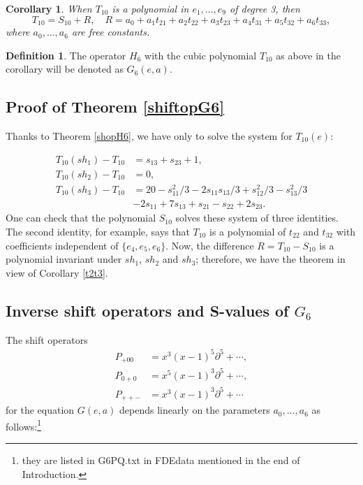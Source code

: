 \documentclass[a4paper,12pt]{article}
\newtheorem{cor}[thm]{Corollary}
\theoremstyle{definition}
\newtheorem{dfn}[thm]{Definition}
\theoremstyle{remark}
\numberwithin{equation}{section} %
\begin{document}

\begin{cor}\label{t2t3bis}
When $T_{10}$ is a polynomial in $e_1,\dots,e_9$ of degree 3, then
\[T_{10}=S_{10}+R,\quad R=a_0+a_1t_{21}+a_2t_{22}+a_3t_{23}+a_4t_{31}+a_5t_{32}+a_6t_{33},\]
where $a_0,\dots,a_6$ are free constants.
\end{cor}

\begin{dfn}The operator $H_6$ with the cubic polynomial $T_{10}$ as above 
in the corollary will be denoted as $G_6(e,a)$. \end{dfn}

\subsection{Proof of Theorem \ref{shiftopG6}}%
Thanks to Theorem \ref{shopH6}, we have only to solve the system for $T_{10}(e)$:

\[
\begin{array}{ll}
  T_{10}(sh_1)-T_{10}&=s_{13}+s_{23}+1,\\[2mm]
T_{10}(sh_2)-T_{10}&=0,\\[2mm]
T_{10}(sh_3)-T_{10}&=20-s_{11}^2/3-2s_{11}s_{13}/3+s_{12}^2/3-s_{13}^2/3\\
&-2s_{11}+7s_{13}+s_{21}-s_{22}+2s_{23}.
\end{array}
\]
One can check that the polynomial $S_{10}$ solves these system 
of three identities. The second identity, for example, 
says that $T_{10}$ is a polynomial of $t_{22}$ and $t_{32}$ 
with coefficients independent of $\{e_4,e_5,e_6\}$. 
Now, the difference $R=T_{10}-S_{10}$ is a polynomial invariant 
under $sh_1$, $sh_2$ and $sh_3$; therefore, we have the theorem
in view of Corollary \ref{t2t3}.

\subsection{Inverse shift operators and S-values of $G_6$}
The shift operators
$$\begin{array}{ll}P_{+00}&=x^3(x-1)^5\partial^5+\cdots,\\
P_{0+0}&=x^5(x-1)^3\partial^5+\cdots,\\
P_{++-}&=x^3(x-1)^3\partial^5+\cdots\end{array}$$
for the equation $G(e,a)$ depends linearly on the parameters $a_0,\dots, a_6$ as follows:\footnote{they are listed in G6PQ.txt in FDEdata mentioned in the end of Introduction.}
\end{document}
